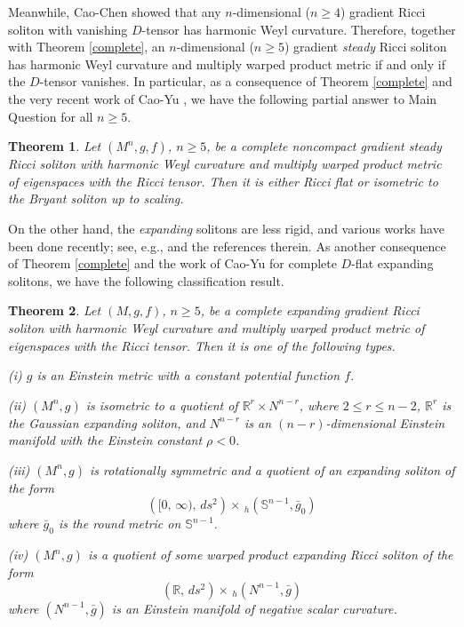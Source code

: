 \documentclass{amsart}
\newtheorem{theorem}{Theorem}[section]
\theoremstyle{definition}
\theoremstyle{remark}
\numberwithin{equation}{section}
\begin{document}
Meanwhile, Cao-Chen \cite{CC2}  showed that any $n$-dimensional ($n\geq 4$) gradient Ricci soliton with vanishing $D$-tensor has harmonic Weyl curvature. Therefore, together with Theorem \ref{complete},  an $n$-dimensional ($n\geq 5$) gradient {\it steady} Ricci soliton has harmonic Weyl curvature and multiply warped product metric if and only if the $D$-tensor vanishes.
In particular, as a consequence of Theorem \ref{complete} and the very recent work of Cao-Yu \cite{CY}, we have the following partial answer to Main Question for all $n\ge 5$.  

\begin{theorem} \label{steady}
Let $(M^n, g, f)$, $n\geq 5$, be a complete noncompact gradient steady Ricci soliton with harmonic Weyl curvature  and multiply warped product metric of eigenspaces  with the Ricci tensor. Then it is either Ricci flat or isometric to the Bryant soliton up to scaling.
\end{theorem}

On the other hand, the {\it expanding} solitons are less rigid, and various works have been done recently; see, e.g., \cite{PW, CD, Cho} and the references therein. As another consequence of Theorem \ref{complete} and the work of Cao-Yu \cite{CY} for complete $D$-flat expanding solitons, we have the following classification result.

\begin{theorem} \label{expand}
Let $(M, g,f)$, $n\geq 5$, be a complete expanding gradient Ricci soliton with harmonic Weyl curvature and multiply warped product metric of eigenspaces  with the Ricci tensor.
Then it is one of the following types.
	
	\smallskip	
	{\rm (i)} $g$ is an Einstein metric with a constant potential function $f$.
	
	\smallskip	
	{\rm (ii)}
	$(M^n, g)$ is isometric to a quotient of 
	$ \mathbb{R}^{r} \times {N}^{n-r}$,
	where $2 \leq r\leq n-2$, $ \mathbb{R}^{r}$ is the Gaussian expanding soliton, and ${N}^{n-r}$ is an $(n-r)$-dimensional Einstein manifold with the Einstein constant $\rho < 0$.	
	
	\smallskip
	{\rm (iii)} $(M^n, g)$ is rotationally  symmetric and a quotient of an expanding soliton of the form
	\[
	\left( [0,\, \infty),\, ds^2 \right) \times \,_h\left(\mathbb{S}^{n-1}, \bar{g}_0\right) 
	\]
    where $\bar{g}_0$ is the round metric on $\mathbb{S}^{n-1}$.

	\smallskip
{\rm (iv)} $(M^n, g)$ is a quotient of some warped product expanding Ricci soliton of the form
	\[
\left(\mathbb{R} ,\, ds^2 \right) \times\, _h\left(N^{n-1}, \bar{g} \right) 
\]
where $\left(N^{n-1}, \bar{g} \right) $ is an Einstein manifold of negative scalar curvature.
\end{theorem}
\end{document}
